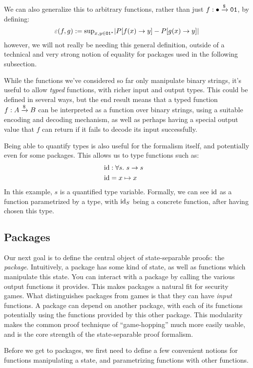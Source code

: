 We can also generalize this to arbitrary functions, rather than just
$f : \bullet \xrightarrow{\$} \texttt{01}$, by defining:
$$
\varepsilon(f, g) := \text{sup}_{x, y \in \texttt{01}^*} |P[f(x) \to y] - P[g(x) \to y]|
$$
however, we will not really be needing this general definition, outside
of a technical and very strong notion of equality for packages
used in the following subsection.

While the functions we've considered so far only manipulate binary strings,
it's useful to allow \emph{typed} functions,
with richer input and output types.
This could be defined in several ways, but the end result means
that a typed function $f : A \xrightarrow{\$} B$ can be interpreted as a function
over binary strings, using a suitable encoding and decoding mechanism,
as well as perhaps having a special output value that $f$ can return
if it fails to decode its input successfully.

Being able to quantify types is also useful for the formalism itself,
and potentially even for some packages.
This allows us to type functions such as:
$$
\begin{aligned}
    &\text{id} : \forall s.\ s \to s\cr
    &\text{id} = x \mapsto x
\end{aligned}
$$
In this example, $s$ is a quantified type variable.
Formally, we can see $\text{id}$ as a function parametrized by a type,
with $\text{id}_S$ being a concrete function, after having chosen this type.

\subsection{Packages}

Our next goal is to define the central object of state-separable proofs:
the \emph{package}.
Intuitively, a package has some kind of state, as well as functions
which manipulate this state.
You can interact with a package by calling the various output functions
it provides.
This makes packages a natural fit for security games.
What distinguishes packages from games is that they can have \emph{input}
functions.
A package can depend on another package, with each of its functions
potentially using the functions provided by this other package.
This modularity makes the common proof technique of ``game-hopping''
much more easily usable, and is the core strength of the state-separable
proof formalism.

Before we get to packages, we first need to define a few convenient
notions for functions manipulating a state, and parametrizing
functions with other functions.

